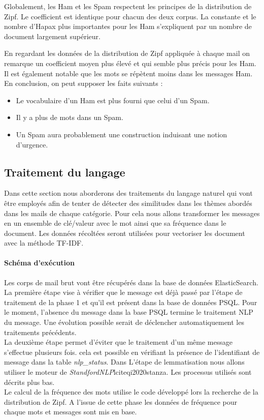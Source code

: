 \documentclass[a4paper,12pt]{article}
\begin{document}
			Globalement, les Ham et les Spam respectent les principes de la distribution de Zipf. Le coefficient est identique pour chacun des deux corpus. La constante et le nombre d'Hapax plus importantes pour les Ham s'expliquent par un nombre de document largement supérieur.
			 
			En regardant les données de la distribution de Zipf appliquée à chaque mail on remarque un coefficient moyen plus élevé et qui semble plus précis pour les Ham. Il est également notable que les mots se répètent moins dans les messages Ham.\\
			
			
			En conclusion, on peut supposer les faits suivants : 
			\begin{itemize}
				\item Le vocabulaire d'un Ham est plus fourni que celui d'un Spam.
				\item Il y a plus de mots dans un Spam.
				\item Un Spam aura probablement une construction induisant une notion d'urgence.
			\end{itemize}
			
		
	\subsection{Traitement du langage}
		 Dans cette section nous aborderons des traitements du langage naturel qui vont être employés afin de tenter de détecter des similitudes dans les thèmes abordés dans les mails de chaque catégorie. Pour cela nous allons transformer les messages en un ensemble de clé/valeur avec le mot ainsi que sa fréquence dans le document. Les données récoltées seront utilisées pour vectoriser les document avec la méthode TF-IDF.
		 
			
		 \paragraph{Schéma d’exécution}
		 	Les corps de mail brut vont être récupérés dans la base de données ElasticSearch.\\ 
		 	La première étape vise à vérifier que le message est déjà passé par l'étape de traitement de la phase 1 et qu'il est présent dans la base de données PSQL. Pour le moment, l'absence du message dans la base PSQL termine le traitement NLP du message. Une évolution possible serait de déclencher automatiquement les traitements précédents. \\
		 	La deuxième étape permet d'éviter que le traitement d'un même message s'effectue plusieurs fois. cela est possible en vérifiant la présence de l'identifiant de message dans la table \emph{nlp\_status}.
		 	Dans L'étape de lemmatisation nous allons utiliser le moteur de \emph{StandfordNLP}\cite{manning-EtAl:2014:P14-5}lcite{qi2020stanza}. Les processus utilisés sont décrits plus bas.\\
		 	Le calcul de la fréquence des mots utilise le code développé lors la recherche de la distribution de Zipf. A l'issue de cette phase les données de fréquence pour chaque mots et messages sont mis en base.
		 
\end{document}
